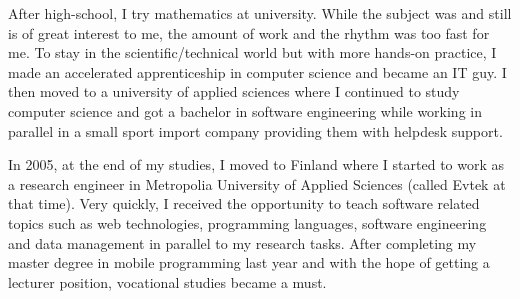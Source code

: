 After high-school, I try mathematics at university. While the subject was and still is of great interest to me, the amount of work and the rhythm was too fast for me. 
To stay in the scientific/technical world but with more hands-on practice, I made an accelerated apprenticeship in computer science and became an IT guy. 
I then moved to a university of applied sciences where I continued to study computer science and got a bachelor in software engineering while working in parallel in a small sport import company providing them with helpdesk support.

In 2005, at the end of my studies, I moved to Finland where I started to work as a research engineer in Metropolia University of Applied Sciences (called Evtek at that time). 
Very quickly, I received the opportunity to teach software related topics such as web technologies, programming languages, software engineering and data management in parallel to my research tasks. 
After completing my master degree in mobile programming last year and with the hope of getting a lecturer position, vocational studies became a must.



  